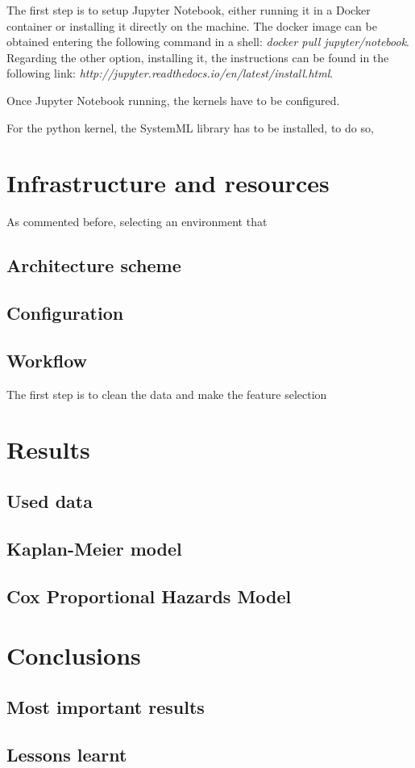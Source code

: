 \documentclass[11pt]{article} %
\begin{document}
    The first step is to setup Jupyter Notebook, either running it in a Docker container or installing it directly on the machine. The docker image can be obtained entering the following command in a shell: \emph{docker pull jupyter/notebook}. Regarding the other option, installing it, the instructions can be found in the following link: \emph{http://jupyter.readthedocs.io/en/latest/install.html}.

    Once Jupyter Notebook running, the kernels have to be configured.

    For the python kernel, the SystemML library has to be installed, to do so,



\section{Infrastructure and resources}

  As commented before, selecting an environment that

  \subsection{Architecture scheme}

  \subsection{Configuration}

  \subsection{Workflow}

    The first step is to clean the data and make the feature selection


\section{Results}

  \subsection{Used data}

  \subsection{Kaplan-Meier model}

  \subsection{Cox Proportional Hazards Model}

\section{Conclusions}

  \subsection{Most important results}

  \subsection{Lessons learnt}
\end{document}
